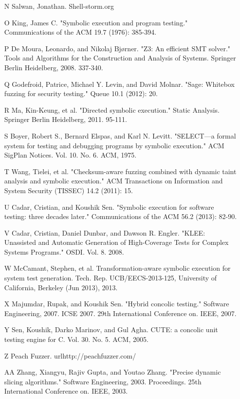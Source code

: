 \documentclass[11pt,expanded,copyright]{fsuthesis}
\begin{document}
\begin{itemize}
	\item [N] Salwan, Jonathan. Shell-storm.org %
	\item [O] King, James C. "Symbolic execution and program testing." Communications of the ACM 19.7 (1976): 385-394.
	\item [P] De Moura, Leonardo, and Nikolaj Bjørner. "Z3: An efficient SMT solver." Tools and Algorithms for the Construction and Analysis of Systems. Springer Berlin Heidelberg, 2008. 337-340.
	\item [Q] Godefroid, Patrice, Michael Y. Levin, and David Molnar. "Sage: Whitebox fuzzing for security testing." Queue 10.1 (2012): 20.
	\item [R] Ma, Kin-Keung, et al. "Directed symbolic execution." Static Analysis. Springer Berlin Heidelberg, 2011. 95-111.
	\item [S] Boyer, Robert S., Bernard Elspas, and Karl N. Levitt. "SELECT—a formal system for testing and debugging programs by symbolic execution." ACM SigPlan Notices. Vol. 10. No. 6. ACM, 1975.
	\item [T] Wang, Tielei, et al. "Checksum-aware fuzzing combined with dynamic taint analysis and symbolic execution." ACM Transactions on Information and System Security (TISSEC) 14.2 (2011): 15.
	\item [U] Cadar, Cristian, and Koushik Sen. "Symbolic execution for software testing: three decades later." Communications of the ACM 56.2 (2013): 82-90.
	\item [V] Cadar, Cristian, Daniel Dunbar, and Dawson R. Engler. "KLEE: Unassisted and Automatic Generation of High-Coverage Tests for Complex Systems Programs." OSDI. Vol. 8. 2008.
	\item [W] McCamant, Stephen, et al. Transformation-aware symbolic execution for system test generation. Tech. Rep. UCB/EECS-2013-125, University of California, Berkeley (Jun 2013), 2013.
	\item [X] Majumdar, Rupak, and Koushik Sen. "Hybrid concolic testing." Software Engineering, 2007. ICSE 2007. 29th International Conference on. IEEE, 2007.
	\item [Y] Sen, Koushik, Darko Marinov, and Gul Agha. CUTE: a concolic unit testing engine for C. Vol. 30. No. 5. ACM, 2005.
	\item [Z] Peach Fuzzer. url{http://peachfuzzer.com/}
	\item [AA] Zhang, Xiangyu, Rajiv Gupta, and Youtao Zhang. "Precise dynamic slicing algorithms." Software Engineering, 2003. Proceedings. 25th International Conference on. IEEE, 2003.

\end{itemize}
\end{document}
